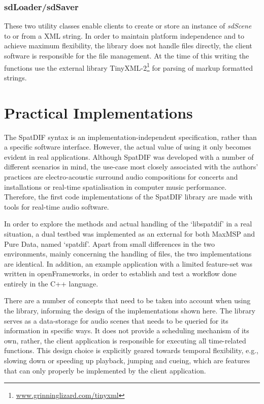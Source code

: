 \documentclass{article}
\begin{document}
\subsubsection*{sdLoader/sdSaver}
These two utility classes enable clients to create or store an instance of \emph{sdScene} to or from a XML string. 
In order to maintain platform independence and to achieve maximum flexibility, the library does not handle files directly, the client software is responsible for the file management. 
At the time of this writing the functions use the external library TinyXML-2\footnote{\href{http://www.grinninglizard.com/tinyxml}{www.grinninglizard.com/tinyxml} } for parsing of markup formatted strings.

\section{Practical Implementations}\label{practical_usage}

The SpatDIF syntax is an implementation-independent specification, rather than a specific software interface. 
However, the actual value of using it only becomes evident in real applications. 
Although SpatDIF was developed with a number of different scenarios in mind, the use-case most closely associated with the authors' practices are electro-acoustic surround audio compositions for concerts and installations or real-time spatialisation in computer music performance.
Therefore, the first code implementations of the SpatDIF library are made with tools for real-time audio software.

In order to explore the methods and actual handling of the `libspatdif' in a real situation, a dual testbed was implemented as an external for both MaxMSP and Pure Data, named `spatdif'.
Apart from small differences in the two environments, mainly concerning the handling of files, the two implementations are identical.
In addition, an example application with a limited feature-set was written in openFrameworks, in order to establish and test a workflow done entirely in the C++ language.

There are a number of concepts that need to be taken into account when using the library, informing the design of the implementations shown here.
The library serves as a data-storage for audio scenes that needs to be queried for its information in specific ways.
It does not provide a scheduling mechanism of its own, rather, the client application is responsible for executing all time-related functions.
This design choice is explicitly geared towards temporal flexibility, e.g., slowing down or speeding up playback, jumping and cueing, which are features that can only properly be implemented by the client application.
\end{document}
